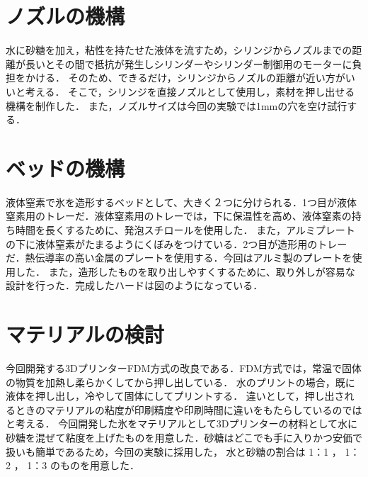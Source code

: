 \section{ノズルの機構}
\label{sec:paragraph}
水に砂糖を加え，粘性を持たせた液体を流すため，シリンジからノズルまでの距離が長いとその間で抵抗が発生しシリンダーやシリンダー制御用のモーターに負担をかける．
そのため、できるだけ，シリンジからノズルの距離が近い方がいいと考える．
そこで，シリンジを直接ノズルとして使用し，素材を押し出せる機構を制作した．
また，ノズルサイズは今回の実験では1mmの穴を空け試行する．

\section{ベッドの機構}
\label{sec:paragraph}
液体窒素で氷を造形するベッドとして、大きく２つに分けられる．1つ目が液体窒素用のトレーだ．液体窒素用のトレーでは，下に保温性を高め、液体窒素の持ち時間を長くするために、発泡スチロールを使用した．
また，アルミプレートの下に液体窒素がたまるようにくぼみをつけている．2つ目が造形用のトレーだ．熱伝導率の高い金属のプレートを使用する．今回はアルミ製のプレートを使用した．
また，造形したものを取り出しやすくするために、取り外しが容易な設計を行った．完成したハードは図のようになっている．

\section{マテリアルの検討}
\label{sec:paragraph}
今回開発する3DプリンターFDM方式の改良である．FDM方式では，常温で固体の物質を加熱し柔らかくしてから押し出している．
水のプリントの場合，既に液体を押し出し，冷やして固体にしてプリントする．
違いとして，押し出されるときのマテリアルの粘度が印刷精度や印刷時間に違いをもたらしているのではと考える．
今回開発した氷をマテリアルとして3Dプリンターの材料として水に砂糖を混ぜて粘度を上げたものを用意した．砂糖はどこでも手に入りかつ安価で扱いも簡単であるため，今回の実験に採用した，
水と砂糖の割合は 1：1 ， 1：2 ， 1：3 のものを用意した．



